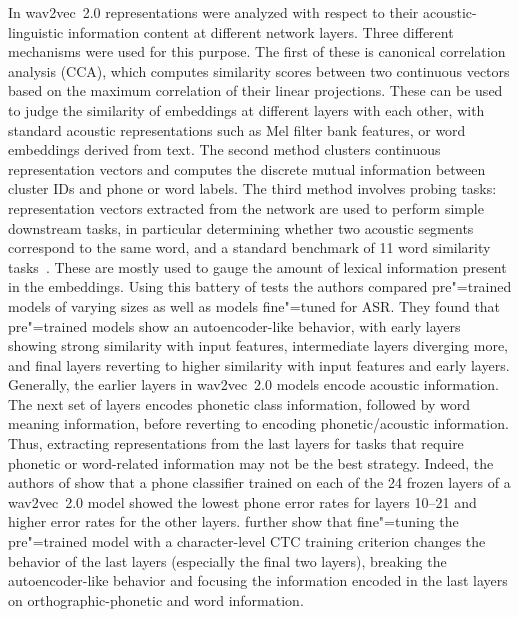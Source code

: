 In \parencite{pasad_layerwise_2021} wav2vec~2.0 representations were analyzed with
respect to their acoustic-linguistic information content at different
network layers. Three different mechanisms were used for this
purpose. The first of these is canonical correlation analysis (CCA),
which computes similarity scores between two continuous vectors
based on the maximum correlation of their linear projections.  These
can be used to judge the similarity of embeddings at different layers
with each other, with standard acoustic representations such as Mel
filter bank features, or word embeddings derived from text. The second
method clusters continuous representation vectors and computes the
discrete mutual information between cluster IDs and phone or word
labels. The third method involves probing tasks: representation
vectors extracted from the network are used to perform simple
downstream tasks, in particular determining whether two acoustic segments
correspond to the same word, and a standard benchmark of 11 word
similarity tasks~\parencite{faruqi_community_2014}. These are mostly used to gauge the
amount of lexical information present in the embeddings.  Using this
battery of tests the authors compared pre"=trained models of varying
sizes as well as models fine"=tuned for ASR. They found that pre"=trained
models show an autoencoder-like behavior, with early layers showing
strong similarity with input features, intermediate layers diverging
more, and final layers reverting to higher similarity with input
features and early layers. Generally, the earlier layers in wav2vec~2.0 
models encode acoustic information. The next set of layers encodes
phonetic class information, followed by word meaning information,
before reverting to encoding phonetic/acoustic information. Thus,
extracting representations from the last layers for tasks that require
phonetic or word-related information may not be the best
strategy. Indeed, the authors of \parencite{baevski_unsupervised_2021} show that a
phone classifier trained on each of the 24 frozen layers of a wav2vec~2.0 model
showed the lowest phone error rates
for layers 10--21 and higher error rates for the other layers. 
\parencite{pasad_layerwise_2021} further show that fine"=tuning the pre"=trained model with a
character-level CTC training criterion changes the behavior of the
last layers (especially the final two layers), breaking the
autoencoder-like behavior and focusing the information encoded in the
last layers on orthographic-phonetic and word information. 

